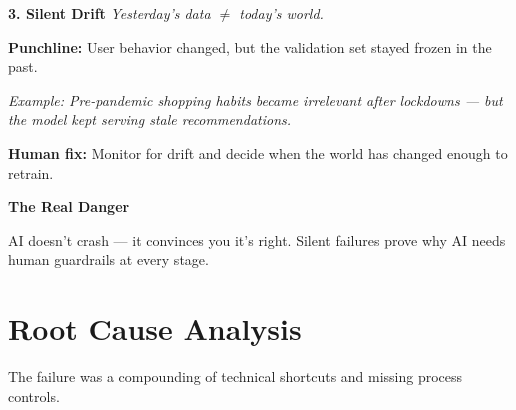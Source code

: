 \documentclass[11pt]{article}
\begin{document}
\vspace{0.08in}

\begin{infobox}[top=6pt, bottom=6pt, left=12pt, right=12pt]
{\normalsize\color{brandblue}\textbf{3. Silent Drift}} \hfill {\footnotesize\color{brandorange}\textit{Yesterday's data $\neq$ today's world.}}

\vspace{0.04in}
{\footnotesize\textbf{Punchline:} User behavior changed, but the validation set stayed frozen in the past.}

\vspace{0.03in}
{\footnotesize\color{brandgray}\textit{Example: Pre-pandemic shopping habits became irrelevant after lockdowns — but the model kept serving stale recommendations.}}

\vspace{0.03in}
{\footnotesize\color{brandred}\textbf{Human fix:} Monitor for drift and decide when the world has changed enough to retrain.}
\end{infobox}

\vspace{0.1in}

\begin{darkbox}[top=6pt, bottom=6pt, left=12pt, right=12pt]
{\normalsize\textbf{The Real Danger}}

\vspace{0.03in}
{\footnotesize AI doesn't crash — it convinces you it's right. Silent failures prove why AI needs human guardrails at every stage.}
\end{darkbox}

\vfill
\newpage


\section*{Root Cause Analysis}

\vspace{0.05in}

{\fontsize{11}{13}\selectfont\color{brandgray}
The failure was a compounding of technical shortcuts and missing process controls.
}

\vspace{0.2in}
\end{document}

